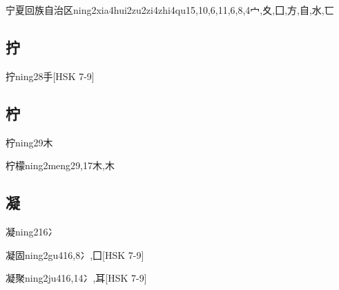 \begin{EntryWithPhonetic}{宁夏回族自治区}{ning2xia4hui2zu2zi4zhi4qu1}{5,10,6,11,6,8,4}{⼧,⼢,⼞,⽅,⾃,⽔,⼖}
\end{EntryWithPhonetic}

\subsection*{拧}

\begin{EntryWithPhonetic}{拧}{ning2}{8}{⼿}[HSK 7-9]
\end{EntryWithPhonetic}

\subsection*{柠}

\begin{EntryWithPhonetic}{柠}{ning2}{9}{⽊}
\end{EntryWithPhonetic}

\begin{EntryWithPhonetic}{柠檬}{ning2meng2}{9,17}{⽊,⽊}
\end{EntryWithPhonetic}

\subsection*{凝}

\begin{EntryWithPhonetic}{凝}{ning2}{16}{⼎}
\end{EntryWithPhonetic}

\begin{EntryWithPhonetic}{凝固}{ning2gu4}{16,8}{⼎,⼞}[HSK 7-9]
\end{EntryWithPhonetic}

\begin{EntryWithPhonetic}{凝聚}{ning2ju4}{16,14}{⼎,⽿}[HSK 7-9]
\end{EntryWithPhonetic}

